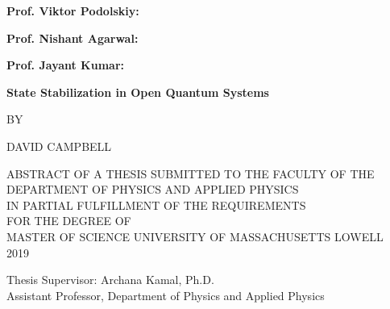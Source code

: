 \documentclass[12pt, oneside]{extarticle}   	%
\newcommand{\sigline}[1]{\bf #1: \underline{\hspace{\textwidth - \widthof{#1:}}}}
\begin{document}
\begin{titlepage}
\vspace{0.10in}
\par
\vspace{0.2in}
\newlength{\lengthvp}
{\bf Prof. Viktor Podolskiy: \underline{\hspace{\lengthvp}}}
\par
\vspace{0.2in}
\newlength{\lengthjz}
{\bf Prof. Nishant Agarwal: \underline{\hspace{\lengthjz}}}
\par
\vspace{0.2in}
\newlength{\lengthjk}
{\bf Prof. Jayant Kumar: \underline{\hspace{\lengthjk}}}

\newpage
{}
\begin{center}
\par
\vspace*{0.5in}
{\bf \Large State Stabilization in Open Quantum Systems}
\par


\vspace{0.5in}
\footnotesize{\normalsize BY}
\par
\vspace{0.35in}
\uppercase{\normalsize David Campbell}\\
\par
\vspace{0.35in}
\uppercase{\normalsize Abstract of a thesis submitted to the faculty of the\\Department of Physics and Applied Physics\\in partial fulfillment of the requirements\\For the degree of\\Master of Science University of Massachusetts Lowell}\\
\footnotesize{2019}
\end{center}
\vspace*{\fill}
\footnotesize{Thesis Supervisor: Archana Kamal, Ph.D.\\ Assistant Professor, Department of Physics and Applied Physics}



\end{titlepage}
\end{document}
